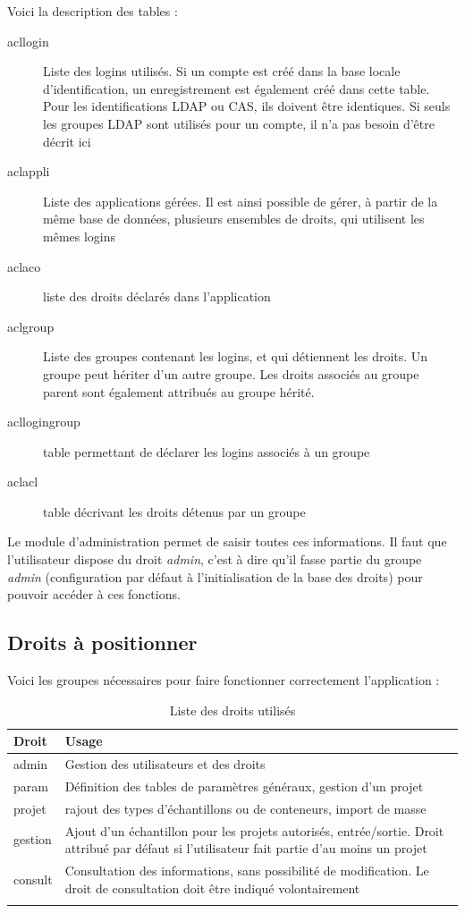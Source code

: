 Voici la description des tables :
\begin{description}
\item[acllogin] Liste des logins utilisés. Si un compte est créé dans la base locale d'identification, un enregistrement est également créé dans cette table. Pour les identifications LDAP ou CAS, ils doivent être identiques. Si seuls les groupes LDAP sont utilisés pour un compte, il n'a pas besoin d'être décrit ici
\item[aclappli] Liste des applications gérées. Il est ainsi possible de gérer, à partir de la même base de données, plusieurs ensembles de droits, qui utilisent les mêmes logins
\item[aclaco] liste des droits déclarés dans l'application
\item[aclgroup] Liste des groupes contenant les logins, et qui détiennent les droits. Un groupe peut hériter d'un autre groupe. Les droits associés au groupe parent sont également attribués au groupe hérité.
\item[acllogingroup] table permettant de déclarer les logins associés à un groupe
\item[aclacl] table décrivant les droits détenus par un groupe
\end{description}

Le module d'administration permet de saisir toutes ces informations. Il faut que l'utilisateur dispose du droit \textit{admin}, c'est à dire qu'il fasse partie du groupe \textit{admin} (configuration par défaut à l'initialisation de la base des droits) pour pouvoir accéder à ces fonctions.

\subsection{Droits à positionner}
Voici les groupes nécessaires pour faire fonctionner correctement l'application :

\begin{longtable}{|p{5cm}|p{10cm}|}
\hline
\textbf{Droit} & \textbf{Usage} \\
\hline
\endhead
admin &	Gestion des utilisateurs et des droits\\
\hline
param &	Définition des tables de paramètres généraux, gestion d'un projet\\
\hline
projet &	rajout des types d'échantillons ou de conteneurs, import de masse \\
\hline
gestion &	Ajout d'un échantillon pour les projets autorisés, entrée/sortie. Droit attribué par défaut si l'utilisateur fait partie d'au moins un projet \\
\hline
consult	& Consultation des informations, sans possibilité de modification. Le droit de consultation doit être indiqué volontairement\\
\hline
\caption{Liste des droits utilisés}
\end{longtable}

